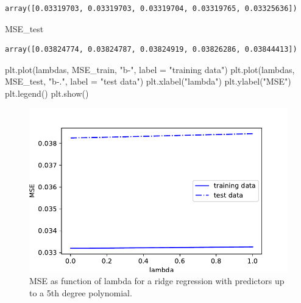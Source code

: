 \documentclass[
  letterpaper,
  DIV=11,
  numbers=noendperiod]{scrartcl}
\newenvironment{Shaded}{\begin{snugshade}}{\end{snugshade}}
\newcommand{\NormalTok}[1]{\textcolor[rgb]{0.00,0.23,0.31}{#1}}
\newcommand{\OperatorTok}[1]{\textcolor[rgb]{0.37,0.37,0.37}{#1}}
\newcommand{\StringTok}[1]{\textcolor[rgb]{0.13,0.47,0.30}{#1}}
\begin{document}
\begin{verbatim}
array([0.03319703, 0.03319703, 0.03319704, 0.03319765, 0.03325636])
\end{verbatim}

\begin{Shaded}
\begin{Highlighting}[]
\NormalTok{MSE\_test}
\end{Highlighting}
\end{Shaded}

\begin{verbatim}
array([0.03824774, 0.03824787, 0.03824919, 0.03826286, 0.03844413])
\end{verbatim}

\begin{Shaded}
\begin{Highlighting}[]
\NormalTok{plt.plot(lambdas, MSE\_train, }\StringTok{"b{-}"}\NormalTok{, label }\OperatorTok{=} \StringTok{"training data"}\NormalTok{)}
\NormalTok{plt.plot(lambdas, MSE\_test, }\StringTok{"b{-}."}\NormalTok{, label }\OperatorTok{=} \StringTok{"test data"}\NormalTok{)}
\NormalTok{plt.xlabel(}\StringTok{"lambda"}\NormalTok{)}
\NormalTok{plt.ylabel(}\StringTok{"MSE"}\NormalTok{)}
\NormalTok{plt.legend()}
\NormalTok{plt.show()}
\end{Highlighting}
\end{Shaded}

\begin{figure}[H]

{\centering \includegraphics{w36-exercises_files/figure-pdf/unnamed-chunk-7-1.pdf}

}

\caption{MSE as function of lambda for a ridge regression with
predictors up to a 5th degree polynomial.}

\end{figure}
\end{document}
